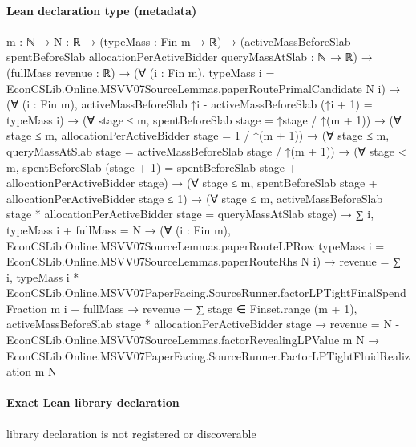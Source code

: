 \documentclass[10pt]{article}
\begin{document}
\paragraph{Lean declaration type (metadata)}
\begin{ReviewVerbatim}
{m : ℕ} →
  {N : ℝ} →
    (typeMass : Fin m → ℝ) →
      (activeMassBeforeSlab spentBeforeSlab allocationPerActiveBidder queryMassAtSlab : ℕ → ℝ) →
        (fullMass revenue : ℝ) →
          (∀ (i : Fin m), typeMass i = EconCSLib.Online.MSVV07SourceLemmas.paperRoutePrimalCandidate N i) →
            (∀ (i : Fin m), activeMassBeforeSlab ↑i - activeMassBeforeSlab (↑i + 1) = typeMass i) →
              (∀ stage ≤ m, spentBeforeSlab stage = ↑stage / ↑(m + 1)) →
                (∀ stage ≤ m, allocationPerActiveBidder stage = 1 / ↑(m + 1)) →
                  (∀ stage ≤ m, queryMassAtSlab stage = activeMassBeforeSlab stage / ↑(m + 1)) →
                    (∀ stage < m,
                        spentBeforeSlab (stage + 1) = spentBeforeSlab stage + allocationPerActiveBidder stage) →
                      (∀ stage ≤ m, spentBeforeSlab stage + allocationPerActiveBidder stage ≤ 1) →
                        (∀ stage ≤ m,
                            activeMassBeforeSlab stage * allocationPerActiveBidder stage = queryMassAtSlab stage) →
                          ∑ i, typeMass i + fullMass = N →
                            (∀ (i : Fin m),
                                EconCSLib.Online.MSVV07SourceLemmas.paperRouteLPRow typeMass i =
                                  EconCSLib.Online.MSVV07SourceLemmas.paperRouteRhs N i) →
                              revenue =
                                  ∑ i,
                                      typeMass i *
                                        EconCSLib.Online.MSVV07PaperFacing.SourceRunner.factorLPTightFinalSpendFraction
                                          m i +
                                    fullMass →
                                revenue =
                                    ∑ stage ∈ Finset.range (m + 1),
                                      activeMassBeforeSlab stage * allocationPerActiveBidder stage →
                                  revenue = N - EconCSLib.Online.MSVV07SourceLemmas.factorRevealingLPValue m N →
                                    EconCSLib.Online.MSVV07PaperFacing.SourceRunner.FactorLPTightFluidRealization m N
\end{ReviewVerbatim}

\paragraph{Exact Lean library declaration}
\begin{ReviewVerbatim}
library declaration is not registered or discoverable
\end{ReviewVerbatim}
\end{document}

